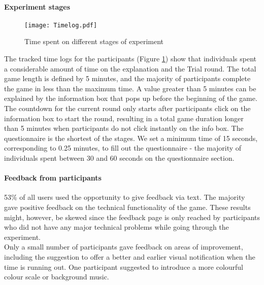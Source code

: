 \paragraph{Experiment stages}
 \begin{figure}[htbp] %
\begin{center} %
  \texttt{[image: Timelog.pdf]}
  \caption[Time spent on different stages of experiment]{Time spent on different stages of experiment\footnotemark}
  \label{Time spent on different stages of experiment}
\end{center}
\end{figure}

The tracked time logs for the participants  (Figure \ref{Time spent on different stages of experiment}) show that individuals spent a considerable amount of time on the explanation and the Trial round. The total game length is defined by 5 minutes, and the majority of participants complete the game in less than the maximum time. A value greater than 5 minutes can be explained by the information box that pops up before the beginning of the game. The countdown for the current round only starts after participants click on the information box to start the round, resulting in a total game duration longer than 5 minutes when participants do not click instantly on the info box.
The questionnaire is the shortest of the stages. We set a minimum time of 15 seconds, corresponding to 0.25 minutes, to fill out the questionnaire - the majority of individuals spent between 30 and 60 seconds on the questionnaire section.

\paragraph{Feedback from participants}
53\% of all users used the opportunity to give feedback via text. The majority gave positive feedback on the technical functionality of the game. These results might, however, be skewed since the feedback page is only reached by participants who did not have any major technical problems while going through the experiment. \\
Only a small number of participants gave feedback on areas of improvement, including the suggestion to offer a better and earlier visual notification when the time is running out. One participant suggested to introduce a more colourful colour scale or background music.


